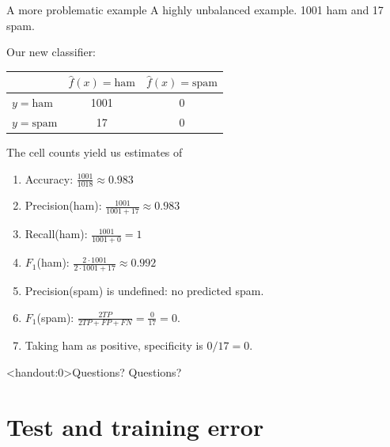 \documentclass[10pt]{beamer}
\begin{document}
\begin{frame}{A more problematic example}
A highly unbalanced example. 1001 ham and 17 spam.

Our new classifier: \pause

\begin{center}
\begin{tabular}{ l | c | c }
  & $\hat{f}(x)=\text{ham}$ & $\hat{f}(x)=\text{spam}$\\
  \hline
  $y=\text{ham}$ & 1001 & 0 \\
  $y=\text{spam}$ & 17 & 0 \\
  \hline
\end{tabular}
\end{center}
\pause
The cell counts yield us estimates of
\begin{enumerate}
\item Accuracy: $\frac{1001}{1018}\approx 0.983$
\item Precision(ham): $\frac{1001}{1001+17}\approx 0.983$
\item Recall(ham): $\frac{1001}{1001+0}=1$
\item $F_1$(ham): $\frac{2\cdot1001}{2\cdot1001+17}\approx 0.992$
\pause
\item Precision(spam) is undefined: no predicted spam.
\item $F_1$(spam): $\frac{2TP}{2TP+FP+FN}=\frac{0}{17}=0$.
\item Taking ham as positive, specificity is $0/17=0$.
\end{enumerate}

\end{frame}




\begin{frame}<handout:0>{Questions?}
Questions?
\end{frame}



\section{Test and training error}
\frame{\sectionpage}
\end{document}
